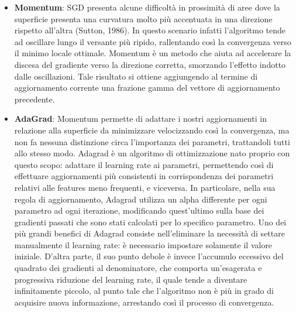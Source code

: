 \begin{itemize}
    \item \textbf{Momentum}: SGD presenta alcune difficoltà in prossimità di aree dove la superficie presenta una curvatura molto più accentuata in una direzione rispetto all'altra (Sutton, 1986). In questo scenario infatti l'algoritmo tende ad oscillare lungo il versante più ripido, rallentando così la convergenza verso il minimo locale ottimale. Momentum \cite{qian1999momentum} è un metodo che aiuta ad accelerare la discesa del gradiente verso la direzione corretta, smorzando l'effetto indotto dalle oscillazioni. Tale risultato si ottiene aggiungendo al termine di aggiornamento corrente una frazione gamma del vettore di aggiornamento precedente.
    
    \item \textbf{AdaGrad}: Momentum permette di adattare i nostri aggiornamenti in relazione alla superficie da minimizzare velocizzando così la convergenza, ma non fa nessuna distinzione circa l'importanza dei parametri, trattandoli tutti allo stesso modo. Adagrad \cite{duchi2011adaptive} è un algoritmo di ottimizzazione nato proprio con questo scopo: adattare il learning rate ai parametri, permettendo così di effettuare aggiornamenti più consistenti in corrispondenza dei parametri relativi alle features meno frequenti, e viceversa. In particolare, nella sua regola di aggiornamento, Adagrad utilizza un alpha differente per ogni parametro ad ogni iterazione, modificando quest'ultimo sulla base dei gradienti passati che sono stati calcolati per lo specifico parametro. Uno dei più grandi benefici di Adagrad consiste nell'eliminare la necessità di settare manualmente il learning rate: è necessario impostare solamente il valore iniziale. D'altra parte, il suo punto debole è invece l'accumulo eccessivo del quadrato dei gradienti al denominatore, che comporta un'esagerata e progressiva riduzione del learning rate, il quale tende a diventare infinitamente piccolo, al punto tale che l'algoritmo non è più in grado di acquisire nuova informazione, arrestando così il processo di convergenza.
\end{itemize}

























